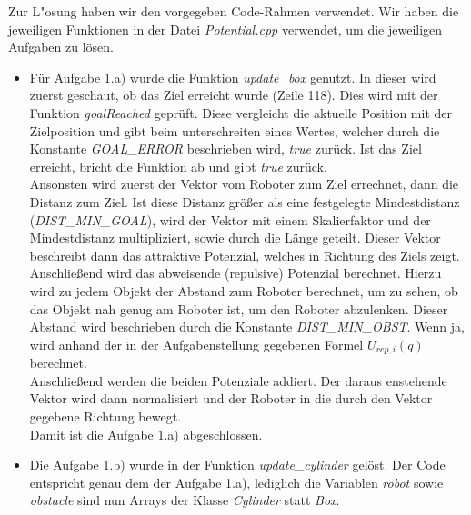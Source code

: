 \documentclass[a4paper]{scrartcl}
\begin{document}
Zur L"osung haben wir den vorgegeben Code-Rahmen verwendet. Wir haben die jeweiligen Funktionen in der Datei \textit{Potential.cpp} verwendet, um die jeweiligen Aufgaben zu lösen.
\begin{itemize}
\item Für Aufgabe 1.a) wurde die Funktion \textit{update\_box} genutzt. In dieser wird zuerst geschaut, ob das Ziel erreicht wurde (Zeile 118). Dies wird mit der Funktion \textit{goalReached} geprüft. Diese vergleicht die aktuelle Position mit der Zielposition und gibt beim unterschreiten eines Wertes, welcher durch die Konstante \textit{GOAL\_ERROR} beschrieben wird, \textit{true} zurück. Ist das Ziel erreicht, bricht die Funktion ab und gibt \textit{true} zurück.\\

Ansonsten wird zuerst der Vektor vom Roboter zum Ziel errechnet, dann die Distanz zum Ziel. Ist diese Distanz größer als eine festgelegte Mindestdistanz (\textit{DIST\_MIN\_GOAL}), wird der Vektor mit einem Skalierfaktor und der Mindestdistanz multipliziert, sowie durch die Länge geteilt. Dieser Vektor beschreibt dann das attraktive Potenzial, welches in Richtung des Ziels zeigt.\\

Anschließend wird das abweisende (repulsive) Potenzial berechnet. Hierzu wird zu jedem Objekt der Abstand zum Roboter berechnet, um zu sehen, ob das Objekt nah genug am Roboter ist, um den Roboter abzulenken. Dieser Abstand wird beschrieben durch die Konstante \textit{DIST\_MIN\_OBST}. Wenn ja, wird anhand der in der Aufgabenstellung gegebenen Formel $U_{rep,i}(q)$ berechnet.\\

Anschließend werden die beiden Potenziale addiert. Der daraus enstehende Vektor wird dann normalisiert und der Roboter in die durch den Vektor gegebene Richtung bewegt.\\

Damit ist die Aufgabe 1.a) abgeschlossen.

\item Die Aufgabe 1.b) wurde in der Funktion \textit{update\_cylinder} gelöst. Der Code entspricht genau dem der Aufgabe 1.a), lediglich die Variablen \textit{robot} sowie \textit{obstacle} sind nun Arrays der Klasse \textit{Cylinder} statt \textit{Box}. 


\end{itemize}
\end{document}
